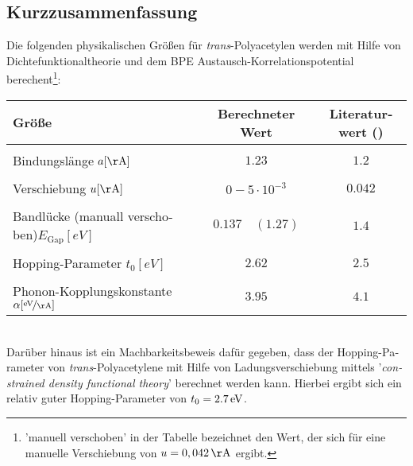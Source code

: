 \begin{otherlanguage}{german}
\chapter*{Kurzzusammenfassung}
Die folgenden physikalischen Größen für \emph{trans}-Polyacetylen werden mit Hilfe von Dichtefunktionaltheorie und dem BPE Austausch-Korrelationspotential berechent\footnote{'manuell verschoben' in der Tabelle bezeichnet den Wert, der sich für eine manuelle Verschiebung von \linebreak $u = \unit[0,042]{\AA}$ ergibt.}:
\begin{table}[!h]
	\centering
	\begin{tabular}{l|c|c}
		Größe & Berechneter Wert & Literaturwert (\cite{PhysRevLett.42.1698, doi:10.1021/cr990357p})\\
		\hline \hline
		&&\\[-.3cm]
		Bindungslänge \hfill$a [\unit{\AA}]$ & $1.23$ & $1.2$\\ \hline&&\\[-.3cm]
		Verschiebung \hfill$u [\unit{\AA}]$& $0 - 5\cdot10^{-3}$ & $0.042$\\ \hline&&\\[-.3cm]
		Bandlücke (manuall verschoben)\hfill$E_\text{Gap} [\unit{eV}]$ & $0.137\quad(1.27)$ & $1.4$\\ \hline &&\\[-.3cm]
		Hopping-Parameter \hfill$t_0 [\unit{eV}]$ & $2.62$ & $2.5$ \\ \hline&&\\[-.3cm]
		Phonon-Kopplungskonstante \hspace*{2cm}$\alpha [\unitfrac{eV}{\AA}]$& $3.95$ & $4.1$
	\end{tabular}
\end{table}\\
Darüber hinaus ist ein Machbarkeitsbeweis dafür gegeben, dass der Hopping-Parameter von \emph{trans}-Polyacetylene mit Hilfe von Ladungsverschiebung mittels '\foreignlanguage{english}{\emph{constrained density functional theory}}' berechnet werden kann. Hierbei ergibt sich ein relativ guter Hopping-Parameter von $t_0 = \unit[2.7]{eV}$.
\end{otherlanguage}